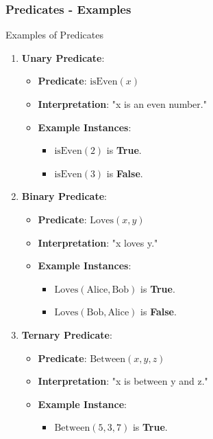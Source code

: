 \documentclass[aspectratio=169]{beamer}
\begin{document}
\begin{frame}[fragile]
    \frametitle{Predicates - Examples}
    \begin{block}{Examples of Predicates}
        \begin{enumerate}
            \item \textbf{Unary Predicate}:
                \begin{itemize}
                    \item \textbf{Predicate}: \( \text{isEven}(x) \)
                    \item \textbf{Interpretation}: "x is an even number."
                    \item \textbf{Example Instances}:
                        \begin{itemize}
                            \item \( \text{isEven}(2) \) is \textbf{True}.
                            \item \( \text{isEven}(3) \) is \textbf{False}.
                        \end{itemize}
                \end{itemize}

            \item \textbf{Binary Predicate}:
                \begin{itemize}
                    \item \textbf{Predicate}: \( \text{Loves}(x, y) \)
                    \item \textbf{Interpretation}: "x loves y."
                    \item \textbf{Example Instances}:
                        \begin{itemize}
                            \item \( \text{Loves}(\text{Alice}, \text{Bob}) \) is \textbf{True}.
                            \item \( \text{Loves}(\text{Bob}, \text{Alice}) \) is \textbf{False}.
                        \end{itemize}
                \end{itemize}

            \item \textbf{Ternary Predicate}:
                \begin{itemize}
                    \item \textbf{Predicate}: \( \text{Between}(x, y, z) \)
                    \item \textbf{Interpretation}: "x is between y and z."
                    \item \textbf{Example Instance}: 
                        \begin{itemize}
                            \item \( \text{Between}(5, 3, 7) \) is \textbf{True}.
                        \end{itemize}
                \end{itemize}
        \end{enumerate}
    \end{block}
\end{frame}
\end{document}
